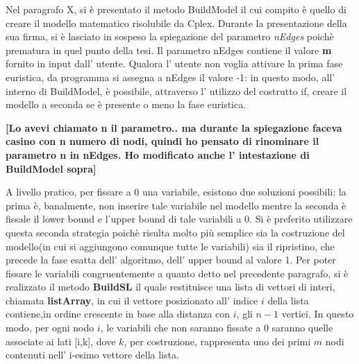 \documentclass[11pt]{article}
\begin{document}
Nel paragrafo X, si è presentato il metodo BuildModel il cui compito è quello di creare il modello matematico risolubile da Cplex. Durante la presentazione della sua firma, si è lasciato in sospeso la spiegazione del parametro \textit{nEdges} poichè prematura in quel punto della tesi. Il parametro nEdges contiene il valore \textbf{m} fornito in input dall' utente. Qualora l' utente non voglia attivare la prima fase euristica, da programma si assegna a nEdges il valore -1: in questo modo, all' interno di BuildModel, è possibile, attraverso l' utilizzo del costrutto if, creare il modello a seconda se è presente o meno la fase euristica. 

\textbf{[Lo avevi chiamato n il parametro.. ma durante la spiegazione faceva casino con n numero di nodi, quindi ho pensato di rinominare il parametro n in nEdges. Ho modificato anche l' intestazione di BuildModel sopra]}

A livello pratico, per fissare a 0 una variabile, esistono due soluzioni possibili: la prima è, banalmente, non inserire tale variabile nel modello mentre la seconda è fissale il lower bound e l'upper bound di tale variabili a 0. Si è preferito utilizzare questa seconda strategia poichè risulta molto più semplice sia la costruzione del modello(in cui si aggiungono comunque tutte le variabili) sia il ripristino, che precede la fase esatta dell' algoritmo, dell' upper bound al valore 1.
Per poter fissare le variabili congruentemente a quanto detto nel precedente paragrafo, si è realizzato il metodo \textbf{BuildSL} il quale restituisce una lista di vettori di interi, chiamata \textbf{listArray}, in cui il vettore posizionato all' indice $i$ della lista contiene,in ordine crescente in base alla distanza con $i$, gli $n-1$ vertici. In questo modo, per ogni nodo $i$, le variabili che non saranno fissate a 0 saranno quelle associate ai lati [i,k], dove $k$, per costruzione, rappresenta uno dei primi $m$ nodi contenuti nell' i-esimo vettore della lista. 
\end{document}
